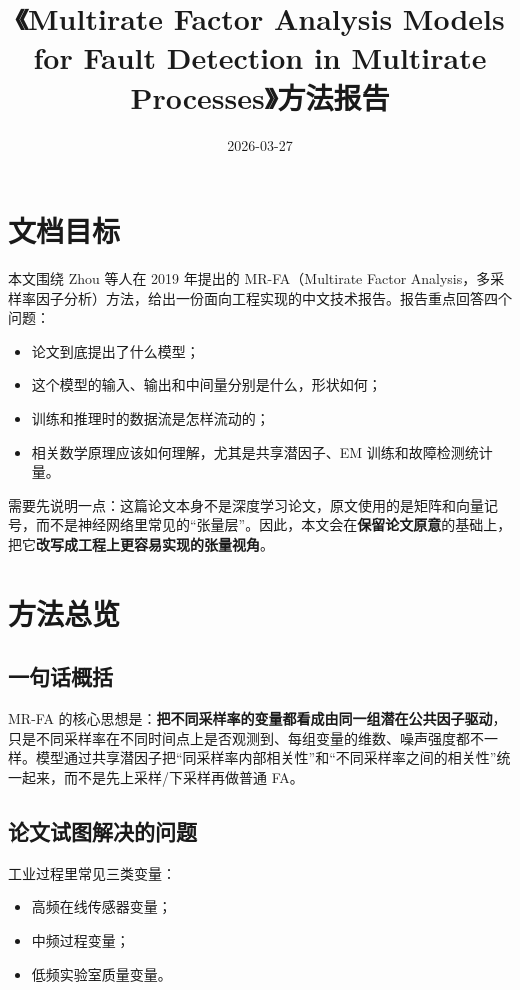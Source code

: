\documentclass[UTF8]{ctexart}
\title{《Multirate Factor Analysis Models for Fault Detection in Multirate Processes》方法报告}
\author{}
\date{2026-03-27}
\begin{document}
\maketitle
\tableofcontents
\newpage

\section{文档目标}

本文围绕 Zhou 等人在 2019 年提出的 MR-FA（Multirate Factor Analysis，多采样率因子分析）方法，给出一份面向工程实现的中文技术报告。报告重点回答四个问题：
\begin{itemize}
    \item 论文到底提出了什么模型；
    \item 这个模型的输入、输出和中间量分别是什么，形状如何；
    \item 训练和推理时的数据流是怎样流动的；
    \item 相关数学原理应该如何理解，尤其是共享潜因子、EM 训练和故障检测统计量。
\end{itemize}

需要先说明一点：这篇论文本身不是深度学习论文，原文使用的是矩阵和向量记号，而不是神经网络里常见的“张量层”。因此，本文会在\textbf{保留论文原意}的基础上，把它\textbf{改写成工程上更容易实现的张量视角}。

\section{方法总览}

\subsection{一句话概括}

MR-FA 的核心思想是：\textbf{把不同采样率的变量都看成由同一组潜在公共因子驱动}，只是不同采样率在不同时间点上是否观测到、每组变量的维数、噪声强度都不一样。模型通过共享潜因子把“同采样率内部相关性”和“不同采样率之间的相关性”统一起来，而不是先上采样/下采样再做普通 FA。

\subsection{论文试图解决的问题}

工业过程里常见三类变量：
\begin{itemize}
    \item 高频在线传感器变量；
    \item 中频过程变量；
    \item 低频实验室质量变量。
\end{itemize}
\end{document}
